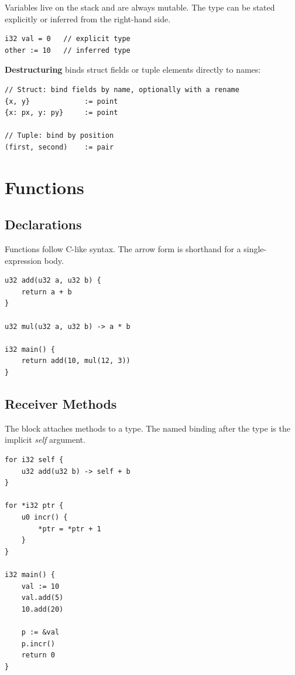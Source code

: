 Variables live on the stack and are always mutable.
The type can be stated explicitly or inferred from the right-hand side.

\begin{lstlisting}[style=zinc, caption={Variable declarations}]
i32 val = 0   // explicit type
other := 10   // inferred type
\end{lstlisting}

\textbf{Destructuring} binds struct fields or tuple elements directly to names:

\begin{lstlisting}[style=zinc, caption={Destructuring}]
// Struct: bind fields by name, optionally with a rename
{x, y}             := point
{x: px, y: py}     := point

// Tuple: bind by position
(first, second)    := pair
\end{lstlisting}

\section{Functions}

\subsection{Declarations}

Functions follow C-like syntax.
The arrow form \zn{->} is shorthand for a single-expression body.

\begin{lstlisting}[style=zinc, caption={Function declarations}]
u32 add(u32 a, u32 b) {
    return a + b
}

u32 mul(u32 a, u32 b) -> a * b

i32 main() {
    return add(10, mul(12, 3))
}
\end{lstlisting}

\subsection{Receiver Methods}

The  block attaches methods to a type.
The named binding after the type is the implicit \emph{self} argument.

\begin{lstlisting}[style=zinc, caption={Receiver methods}]
for i32 self {
    u32 add(u32 b) -> self + b
}

for *i32 ptr {
    u0 incr() {
        *ptr = *ptr + 1
    }
}

i32 main() {
    val := 10
    val.add(5)
    10.add(20)

    p := &val
    p.incr()
    return 0
}
\end{lstlisting}

